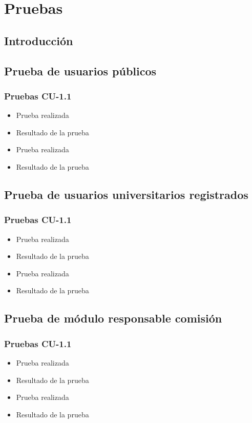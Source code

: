 \chapter{Pruebas}\label{cap:pruebas}

\section{Introducción}

\section{Prueba de usuarios públicos}

\subsection{Pruebas CU-1.1}
 \begin{itemize}
    \item Prueba realizada
    \item Resultado de la prueba
    \item Prueba realizada
    \item Resultado de la prueba
 \end{itemize}

\section{Prueba de usuarios universitarios registrados}

\subsection{Pruebas CU-1.1}
 \begin{itemize}
    \item Prueba realizada
    \item Resultado de la prueba
    \item Prueba realizada
    \item Resultado de la prueba
 \end{itemize}

\section{Prueba de módulo responsable comisión}
\subsection{Pruebas CU-1.1}
 \begin{itemize}
    \item Prueba realizada
    \item Resultado de la prueba
    \item Prueba realizada
    \item Resultado de la prueba
 \end{itemize}

